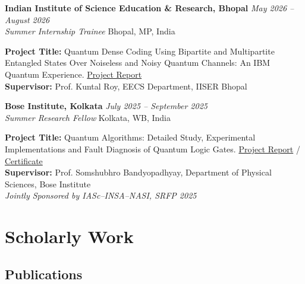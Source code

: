 \documentclass[11pt,a4paper]{article}
\newcommand{\entry}[4]{
    \textbf{#1} \hfill \textit{#2}\\
    \textit{#3} \hfill #4
    \vspace{3pt}
}
\begin{document}
\vspace{0.5cm}

\entry
{Indian Institute of Science Education \& Research, Bhopal}
{May 2026 -- August 2026}
{Summer Internship Trainee}
{Bhopal, MP, India}

\textbf{Project Title:} Quantum Dense Coding Using Bipartite and Multipartite Entangled States Over Noiseless and Noisy Quantum Channels: An IBM Quantum Experience. \href{https://drive.google.com/file/d/1J3n-vC0oDD9sEbbBHkWpspZd-wM6JGFF/view}{Project Report}\\
\textbf{Supervisor:} Prof. Kuntal Roy, EECS Department, IISER Bhopal

\vspace{0.5cm}

\entry
{Bose Institute, Kolkata}
{July 2025 -- September 2025}
{Summer Research Fellow}
{Kolkata, WB, India}

\textbf{Project Title:} Quantum Algorithms: Detailed Study, Experimental Implementations and Fault Diagnosis of Quantum Logic Gates. \href{https://drive.google.com/file/d/1E1iEWA_XGIpx8ue8O8EmcbC7oqrU1EMY/view}{Project Report} / \href{https://drive.google.com/file/d/1NBCb0vpF9wkKBZtGyaOdMJWQPaDDwR7G/view}{Certificate}\\
\textbf{Supervisor:} Prof. Somshubhro Bandyopadhyay, Department of Physical Sciences, Bose Institute\\
\textit{Jointly Sponsored by IASc--INSA--NASI, SRFP 2025}



\section{Scholarly Work}

\subsection*{Publications}
\end{document}
